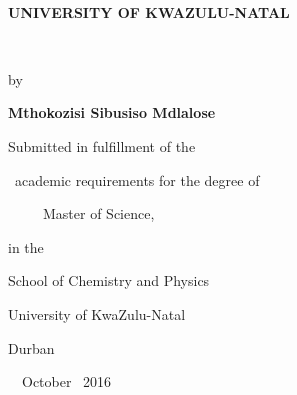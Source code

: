 \newpage \
\begin{center}
\thispagestyle{empty} {\Large \textbf{UNIVERSITY OF KWAZULU-NATAL}}\\[0pt]

\bigskip\bigskip\bigskip\bigskip\bigskip

\bigskip \bigskip \bigskip {}\\[0pt]
\bigskip

\bigskip

\bigskip

{\large by}\vspace{12pt}\vspace{6pt}

{\Large \textbf{Mthokozisi Sibusiso Mdlalose}}

\bigskip

\bigskip

\bigskip

{\Large Submitted in fulfillment of the}

{\Large \ academic requirements for the degree of }

\ \ \ \ \ {\Large Master of Science, }

{\Large in the }

{\Large School of Chemistry and Physics}

{\Large University of KwaZulu-Natal}

\vspace{6pt}

\bigskip\bigskip\bigskip\bigskip\bigskip

{\large Durban}

\ \ {\large October \ 2016}


\end{center}
\newpage %
